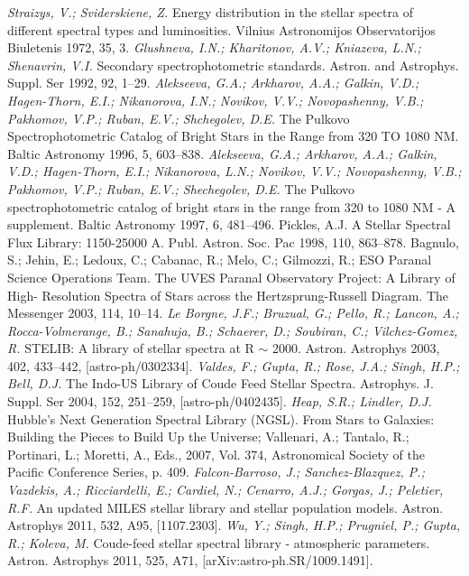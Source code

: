 \documentclass[12pt, a4paper]{article}
\begin{document}
\newpage
{}
\begin{thebibliography}{00}
    \textit{Straizys, V.; Sviderskiene, Z.} Energy distribution in the stellar spectra of different spectral types and luminosities. Vilnius Astronomijos Observatorijos Biuletenis 1972, 35, 3.
    \textit{Glushneva, I.N.; Kharitonov, A.V.; Kniazeva, L.N.; Shenavrin, V.I.} Secondary spectrophotometric standards. Astron. and Astrophys. Suppl. Ser 1992, 92, 1–29.
    \textit{Alekseeva, G.A.; Arkharov, A.A.; Galkin, V.D.; Hagen-Thorn, E.I.; Nikanorova, I.N.; Novikov, V.V.; Novopashenny, V.B.; Pakhomov, V.P.; Ruban, E.V.; Shchegolev, D.E.} The Pulkovo Spectrophotometric Catalog of Bright Stars in the Range from 320 TO 1080 NM. Baltic Astronomy 1996, 5, 603–838.
    \textit{Alekseeva, G.A.; Arkharov, A.A.; Galkin, V.D.; Hagen-Thorn, E.I.; Nikanorova, L.N.; Novikov, V.V.; Novopashenny, V.B.; Pakhomov, V.P.; Ruban, E.V.; Shechegolev, D.E.} The Pulkovo spectrophotometric catalog of bright stars in the range from 320 to 1080 NM - A supplement. Baltic Astronomy 1997, 6, 481–496. Pickles, A.J. A Stellar Spectral Flux Library: 1150-25000 A. Publ. Astron. Soc. Pac 1998, 110, 863–878. Bagnulo, S.; Jehin, E.; Ledoux, C.; Cabanac, R.; Melo, C.; Gilmozzi, R.; ESO Paranal Science Operations Team. The UVES Paranal Observatory Project: A Library of High- Resolution Spectra of Stars across the Hertzsprung-Russell Diagram. The Messenger 2003, 114, 10–14.
    \textit{Le Borgne, J.F.; Bruzual, G.; Pello, R.; Lancon, A.; Rocca-Volmerange, B.; Sanahuja, B.; Schaerer, D.; Soubiran, C.; Vilchez-Gomez, R.} STELIB: A library of stellar spectra at R $\sim$ 2000. Astron. Astrophys 2003, 402, 433–442, [astro-ph/0302334].
    \textit{Valdes, F.; Gupta, R.; Rose, J.A.; Singh, H.P.; Bell, D.J.} The Indo-US Library of Coude Feed Stellar Spectra. Astrophys. J. Suppl. Ser 2004, 152, 251–259, [astro-ph/0402435].
    \textit{Heap, S.R.; Lindler, D.J.} Hubble’s Next Generation Spectral Library (NGSL). From Stars to Galaxies: Building the Pieces to Build Up the Universe; Vallenari, A.; Tantalo, R.; Portinari, L.; Moretti, A., Eds., 2007, Vol. 374, Astronomical Society of the Pacific Conference Series, p. 409.
    \textit{Falcon-Barroso, J.; Sanchez-Blazquez, P.; Vazdekis, A.; Ricciardelli, E.; Cardiel, N.; Cenarro, A.J.; Gorgas, J.; Peletier, R.F.} An updated MILES stellar library and stellar population models. Astron. Astrophys 2011, 532, A95, [1107.2303].
    \textit{Wu, Y.; Singh, H.P.; Prugniel, P.; Gupta, R.; Koleva, M.} Coude-feed stellar spectral library - atmospheric parameters. Astron. Astrophys 2011, 525, A71, [arXiv:astro-ph.SR/1009.1491].

\end{thebibliography}
\end{document}
